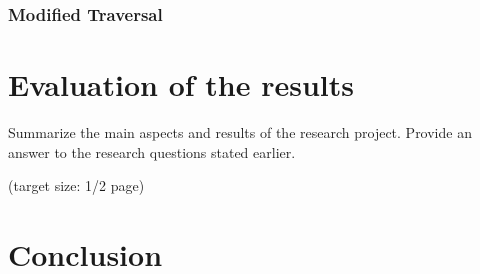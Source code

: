 \documentclass[a4paper,11pt,oneside]{article}
\begin{document}
\subsubsection{Modified Traversal}

\section{Evaluation of the results}

Summarize the main aspects and results of the research
project. Provide an answer to the research questions stated earlier.

(target size: 1/2 page)

\section{Conclusion}

\newpage
%
%
\printbibliography
\end{document}
